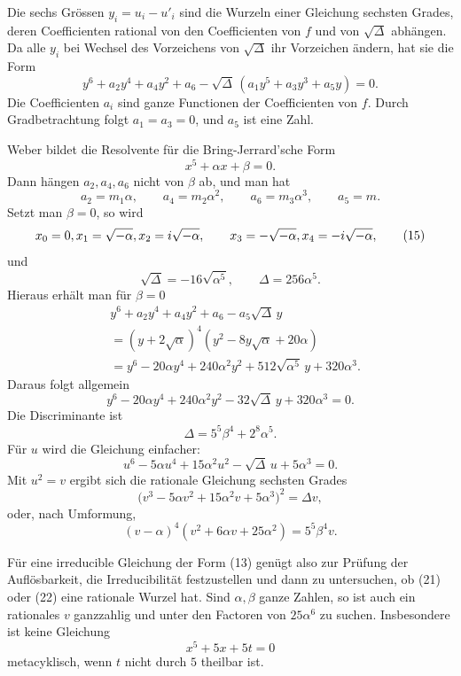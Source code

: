 \documentclass[11pt]{article}
\begin{document}
Die sechs Grössen $y_i=u_i-u'_i$ sind die Wurzeln einer Gleichung sechsten Grades, deren Coefficienten rational von den Coefficienten von $f$ und von $\sqrt\Delta$ abhängen. Da alle $y_i$ bei Wechsel des Vorzeichens von $\sqrt\Delta$ ihr Vorzeichen ändern, hat sie die Form
\[
 y^6+a_2y^4+a_4y^2+a_6-
 \sqrt\Delta\,(a_1y^5+a_3y^3+a_5y)=0.                            \tag{12}
\]
Die Coefficienten $a_i$ sind ganze Functionen der Coefficienten von $f$. Durch Gradbetrachtung folgt $a_1=a_3=0$, und $a_5$ ist eine Zahl.

Weber bildet die Resolvente für die Bring-Jerrard'sche Form
\[
  x^5+\alpha x+\beta=0.                                          \tag{13}
\]
Dann hängen $a_2,a_4,a_6$ nicht von $\beta$ ab, und man hat
\[
  a_2=m_1\alpha,
  \qquad a_4=m_2\alpha^2,
  \qquad a_6=m_3\alpha^3,
  \qquad a_5=m.                                                   \tag{14}
\]
Setzt man $\beta=0$, so wird
\[
 x_0=0,\\ x_1=\sqrt{-\alpha},\\ x_2=i\sqrt{-\alpha},
 \qquad x_3=-\sqrt{-\alpha},\\ x_4=-i\sqrt{-\alpha},              \tag{15}
\]
und
\[
  \sqrt\Delta=-16\sqrt{\alpha^5},
  \qquad \Delta=256\alpha^5.                                     \tag{16}
\]
Hieraus erhält man für $\beta=0$
\[
\begin{aligned}
&y^6+a_2y^4+a_4y^2+a_6-a_5\sqrt\Delta\,y\\
&=(y+2\sqrt\alpha)^4(y^2-8y\sqrt\alpha+20\alpha)\\
&=y^6-20\alpha y^4+240\alpha^2 y^2
  +512\sqrt{\alpha^5}\,y+320\alpha^3 .
\end{aligned}                                                     \tag{17}
\]
Daraus folgt allgemein
\[
  y^6-20\alpha y^4+240\alpha^2y^2
  -32\sqrt\Delta\,y+320\alpha^3=0.                              \tag{18}
\]
Die Discriminante ist
\[
  \Delta=5^5\beta^4+2^8\alpha^5.                                \tag{19}
\]
Für $u$ wird die Gleichung einfacher:
\[
  u^6-5\alpha u^4+15\alpha^2u^2-
  \sqrt\Delta\,u+5\alpha^3=0.                                    \tag{20}
\]
Mit $u^2=v$ ergibt sich die rationale Gleichung sechsten Grades
\[
  \bigl(v^3-5\alpha v^2+15\alpha^2v+5\alpha^3\bigr)^2
  =\Delta v,                                                     \tag{21}
\]
oder, nach Umformung,
\[
  (v-
\alpha)^4(v^2+6\alpha v+25\alpha^2)=5^5\beta^4 v.           \tag{22}
\]

Für eine irreducible Gleichung der Form (13) genügt also zur Prüfung der Auflösbarkeit, die Irreducibilität festzustellen und dann zu untersuchen, ob (21) oder (22) eine rationale Wurzel hat. Sind $\alpha,\beta$ ganze Zahlen, so ist auch ein rationales $v$ ganzzahlig und unter den Factoren von $25\alpha^6$ zu suchen. Insbesondere ist keine Gleichung
\[
  x^5+5x+5t=0
\]
metacyklisch, wenn $t$ nicht durch $5$ theilbar ist.
\end{document}
